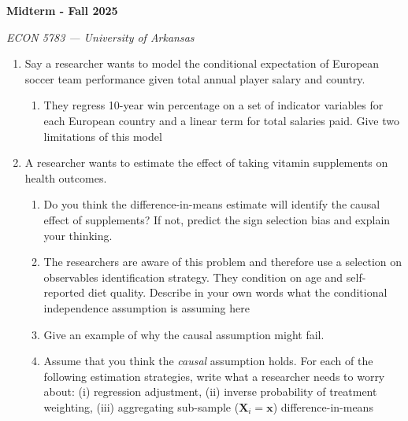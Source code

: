 \documentclass[12pt]{article}
\begin{document}
\begin{center}
  {\Huge\bf Midterm - Fall 2025}

  \smallskip
  {\large\it ECON 5783 — University of Arkansas}
\end{center}

\medskip
\begin{enumerate}
  \item Say a researcher wants to model the conditional expectation
    of European soccer team performance given total annual player
    salary and country.
    \begin{enumerate}[label=(\alph*)]
      \item They regress 10-year win percentage on a set of indicator
        variables for each European country and a linear term for
        total salaries paid.
        Give two limitations of this model %
    \end{enumerate}

    \bigskip\bigskip
  \item A researcher wants to estimate the effect of taking vitamin
    supplements on health outcomes.

    \begin{enumerate}[label=(\alph*)]
      \item Do you think the difference-in-means estimate will
        identify the causal effect of supplements?
        If not, predict the sign selection bias and explain your thinking.

      \item The researchers are aware of this problem and therefore
        use a selection on observables identification strategy.
        They condition on age and self-reported diet quality.
        Describe in your own words what the conditional independence
        assumption is assuming here

      \item Give an example of why the causal assumption might fail.

      \item Assume that you think the \emph{causal} assumption holds.
        For each of the following estimation strategies, write what a
        researcher needs to worry about: (i) regression adjustment,
        (ii) inverse probability of treatment weighting, (iii)
        aggregating sub-sample ($\bm{X}_i = \bm{x}$) difference-in-means
    \end{enumerate}
\end{enumerate}
\end{document}
